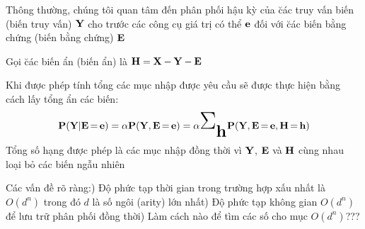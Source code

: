 \documentclass[fleqn]{article}
\begin{document}
\begin{huge}

Thông thường, chúng tôi quan tâm đến \al
  phân phối hậu kỳ của \u{các truy vấn biến (biến truy vấn)} $\mbox{{\bf Y}}$\al
  cho trước các công cụ giá trị có thể $\mbox{{\bf e}}$ đối với \u{các biến bằng chứng (biến bằng chứng)} $\mbox{{\bf E}}$

Gọi \u{các biến ẩn (biến ẩn)} là $\mbox{{\bf H}} = \mbox{{\bf X}} - \mbox{{\bf Y}} - \mbox{{\bf E}}$

Khi được phép tính tổng các mục nhập được yêu cầu sẽ được thực hiện bằng cách lấy tổng
ẩn các biến:
\[
\pv(\mbf{Y}|\mbf{E}\eq \mbf{e}) = \alpha \pv(\mbf{Y},\mbf{E}\eq \mbf{e})
= \alpha \mysum_{\smbf{h}} \pv(\mbf{Y},\mbf{E}\eq \mbf{e},\mbf{H}\eq \mbf{h})
\]
Tổng số hạng được phép là các mục nhập đồng thời vì $\mbox{{\bf Y}}$, $\mbox{{\bf E}}$ và $\mbox{{\bf H}}$ cùng nhau loại bỏ các biến ngẫu nhiên

Các vấn đề rõ ràng:) Độ phức tạp thời gian trong trường hợp xấu nhất là $O(d^n)$ trong đó $d$ là số ngôi (arity) lớn nhất) Độ phức tạp không gian $O(d^n)$ để lưu trữ phân phối đồng thời) Làm cách nào để tìm các số cho mục $O(d^n)$???

\end{huge} 
\end{document}
